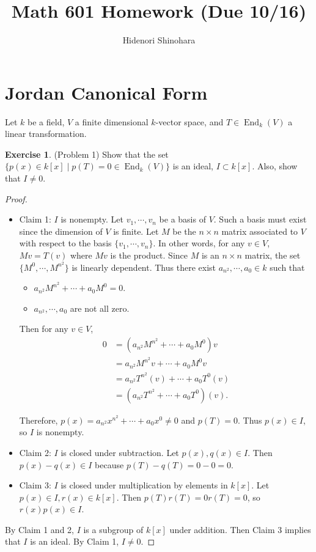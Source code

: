 \documentclass[12pt, psamsfonts]{amsart}
\theoremstyle{definition}
\newtheorem*{exer}{Exercise}
\theoremstyle{remark}
\DeclareMathOperator{\End}{End}
\numberwithin{equation}{section}
\begin{document}
\title{Math 601 Homework (Due 10/16)}
\author{Hidenori Shinohara}
\maketitle

\tableofcontents

\section{Jordan Canonical Form}

Let $k$ be a field, $V$ a finite dimensional $k$-vector space, and $T \in \End_k(V)$ a linear transformation.

\begin{exer}{(Problem 1)}
  Show that the set $\{ p(x) \in k[x] \mid p(T) = 0 \in \End_k(V) \}$ is an ideal, $I \subset k[x]$.
  Also, show that $I \ne 0$.
\end{exer}

\begin{proof}
  $ $
  \begin{itemize}
    \item
      Claim 1: $I$ is nonempty.
      Let $v_1, \cdots, v_n$ be a basis of $V$.
      Such a basis must exist since the dimension of $V$ is finite.
      Let $M$ be the $n \times n$ matrix associated to $V$ with respect to the basis $\{ v_1, \cdots, v_n \}$.
      In other words, for any $v \in V$, $Mv = T(v)$ where $Mv$ is the product.
      Since $M$ is an $n \times n$ matrix, the set $\{ M^0, \cdots, M^{n^2} \}$ is linearly dependent.
      Thus there exist $a_{n^2}, \cdots, a_0 \in k$ such that
      \begin{itemize}
        \item
          $a_{n^2}M^{n^2} + \cdots + a_0M^0 = 0$.
        \item
          $a_{n^2}, \cdots, a_0$ are not all zero.
      \end{itemize}
      Then for any $v \in V$,
      \begin{align*}
        0 &= (a_{n^2}M^{n^2} + \cdots + a_0M^0)v \\
          &= a_{n^2}M^{n^2}v + \cdots + a_0M^0v \\
          &= a_{n^2}T^{n^2}(v) + \cdots + a_0T^0(v) \\
          &= (a_{n^2}T^{n^2} + \cdots + a_0T^0)(v).
      \end{align*}

      Therefore, $p(x) = a_{n^2}x^{n^2} + \cdots + a_0x^0 \ne 0$ and $p(T) = 0$.
      Thus $p(x) \in I$, so $I$ is nonempty.
    \item
      Claim 2: $I$ is closed under subtraction.
      Let $p(x), q(x) \in I$.
      Then $p(x) - q(x) \in I$ because $p(T) - q(T) = 0 - 0 = 0$.
    \item
      Claim 3: $I$ is closed under multiplication by elements in $k[x]$.
      Let $p(x) \in I, r(x) \in k[x]$.
      Then $p(T)r(T) = 0r(T) = 0$, so $r(x)p(x) \in I$.
  \end{itemize}
  By Claim 1 and 2, $I$ is a subgroup of $k[x]$ under addition.
  Then Claim 3 implies that $I$ is an ideal.
  By Claim 1, $I \ne 0$.
\end{proof}
\end{document}
